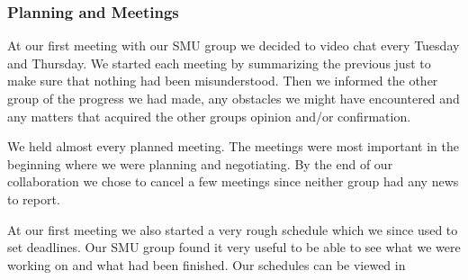 \subsubsection{Planning and Meetings}
At our first meeting with our SMU group we decided to video chat every Tuesday and Thursday. We started each meeting by summarizing the previous just to make sure that nothing had been misunderstood. Then we informed the other group of the progress we had made, any obstacles we might have encountered and any matters that acquired the other groups opinion and/or confirmation. 

We held almost every planned meeting. The meetings were most important in the beginning where we were planning and negotiating. By the end of our collaboration we chose to cancel a few meetings since neither group had any news to report.

At our first meeting we also started a very rough schedule which we since used to set deadlines. Our SMU group found it very useful to be able to see what we were working on and what had been finished.
Our schedules can be viewed in 